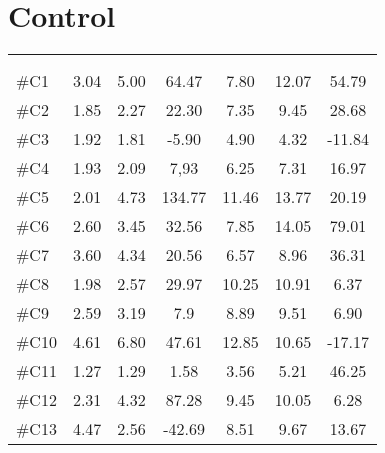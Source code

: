 \vspace{-.5cm}




\section{Control}



\begin{longtable} {l|c|c|c|c|c|c}
 \rowcolor[HTML]{C0C0C0} 
  \color[HTML]{000000}{} & 
 \multicolumn{3}{c|}{ \color[HTML]{000000}{\textbf{Threshold}}} & \multicolumn{3}{c}{ \color[HTML]{000000}{\textbf{Tolerance}}}  	\\  \rule{0pt}{3ex} 
  \cellcolor[HTML]{C0C0C0}{} &
 \multicolumn{1}{c|}{ \cellcolor[HTML]{C0C0C0}{Pre [KgF]}} & \multicolumn{1}{c|}{ \cellcolor[HTML]{C0C0C0}{Post [KgF]}} 
 & \multicolumn{1}{c}{ \cellcolor[HTML]{C0C0C0}{\textcolor[HTML]{C0C0C0}{0}Diff [\%]\textcolor[HTML]{C0C0C0}{0}}}
 & \multicolumn{1}{|c|}{ \cellcolor[HTML]{C0C0C0}{Pre [KgF]}} 
 & \multicolumn{1}{c|}{ \cellcolor[HTML]{C0C0C0}{Post [KgF]}} 
 & \multicolumn{1}{c}{ \cellcolor[HTML]{C0C0C0}{\textcolor[HTML]{C0C0C0}{0}Diff [\%]\textcolor[HTML]{C0C0C0}{0}}}  	\\ \hline   
\#C1 & 3.04	& 5.00	&	64.47	& 7.80	& 	12.07 &	54.79\\ \hline
\#C2 & 1.85 	& 2.27	&	22.30	& 7.35	& 	9.45 & 28.68	\\ \hline
\#C3 & 1.92 	& 1.81	&	-5.90	& 4.90	& 	4.32 & -11.84	\\ \hline
\#C4 & 1.93 	& 2.09	&	7,93		& 6.25	&	7.31 & 16.97	\\ \hline
\#C5 & 2.01 	& 4.73 	& 	134.77	& 11.46		& 13.77 & 20.19		\\ \hline
\#C6 & 2.60 	& 3.45	& 	32.56		& 7.85	& 14.05 & 79.01		\\ \hline	
\#C7 & 3.60 & 4.34	& 	20.56		& 6.57 & 8.96  &	36.31 \\ \hline
\#C8 & 1.98 & 2.57	& 	29.97		& 10.25	& 10.91 &	6.37	\\ \hline
\#C9 & 2.59 & 3.19 	& 	7.9		& 8.89	& 9.51 & 6.90		\\ \hline
\#C10 & 4.61 & 6.80	& 	47.61		& 12.85	& 10.65 & -17.17 \\ \hline
\#C11 & 1.27 & 1.29 	& 	1.58		& 3.56	& 5.21 &  46.25\\ \hline
\#C12 & 2.31 & 4.32 	& 	87.28	& 9.45 & 10.05 & 6.28 \\ \hline
\#C13 & 4.47 & 2.56 	& 	-42.69	& 8.51 & 9.67 & 13.67 \\ \hline

\end{longtable}
